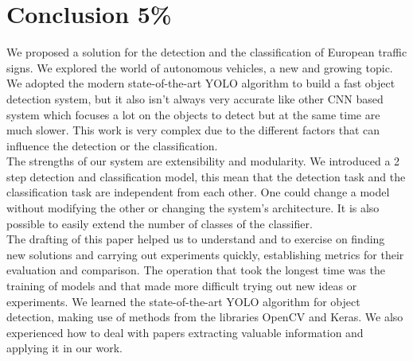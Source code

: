 \section{Conclusion 5\%}
We proposed a solution for the detection and the classification of European traffic signs. We explored the world of autonomous vehicles, a new and growing topic. We adopted the modern state-of-the-art YOLO algorithm to build a fast object detection system, but it also isn't always very accurate like other CNN based system which focuses a lot on the objects to detect but at the same time are much slower. This work is very complex due to the different factors that can influence the detection or the classification.\\

\noindent The strengths of our system are extensibility and modularity. We introduced a 2 step detection and classification model, this mean that the detection task and the classification task are independent from each other. One could change a model without modifying the other or changing the system's architecture. It is also possible to easily extend the number of classes of the classifier.\\

\noindent The drafting of this paper helped us to understand and to exercise on finding new solutions and carrying out experiments quickly, establishing metrics for their evaluation and comparison. The operation that took the longest time was the training of models and that made more difficult trying out new ideas or experiments. We learned the state-of-the-art YOLO algorithm for object detection, making use of methods from the libraries OpenCV and Keras. We also experienced how to deal with papers extracting valuable information and applying it in our work.\\

